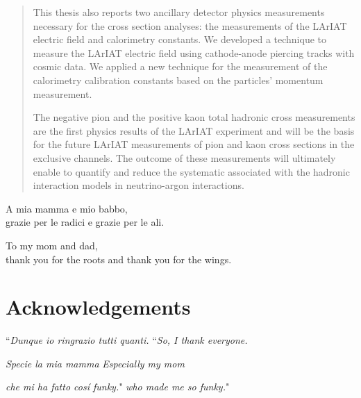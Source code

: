 \documentclass[letterpaper,12pt]{yalephd}
\newenvironment{dedication}
  {%
   \thispagestyle{empty}%
   \vspace*{\stretch{1}}%
   \itshape             %
   \raggedleft          %
  }
  {\par %
   \vspace{\stretch{3}} %
   \clearpage           %
  }
\begin{document}
\begin{abstract}
This thesis also reports two  ancillary  detector physics measurements necessary for the cross section analyses: the measurements of the LArIAT electric field and calorimetry constants. We developed a technique to measure the LArIAT electric field using cathode-anode piercing tracks with cosmic data. We applied a new technique for the measurement of the calorimetry calibration constants based on the particles' momentum measurement.


The negative pion and the positive kaon total hadronic cross measurements are the first physics results of the LArIAT experiment and will be the basis for the future LArIAT measurements of pion and kaon cross sections in the exclusive channels.
The outcome of these measurements will ultimately enable to quantify and reduce the systematic associated with the hadronic interaction models in neutrino-argon interactions.

\end{abstract}


\maketitle
{}

 \begin{dedication}
A mia mamma e mio babbo,\\
grazie per le radici e grazie per le ali.
    \par   %
    \vspace{2\baselineskip}
To my mom and dad,\\
thank you for the roots and thank you for the wings.
    \vspace{\baselineskip}
  \end{dedication}

\tableofcontents
\listoffigures %
\listoftables %

\chapter{Acknowledgements} %

\noindent ``\emph{Dunque io ringrazio tutti quanti.} \hfill ``\emph{So, I thank everyone.} 

\noindent \emph{Specie la mia mamma} \hfill \emph{Especially my mom} 

\noindent \emph{che mi ha fatto cos\'i funky.}" \hfill \emph{who made me so funky.}"
\end{document}
